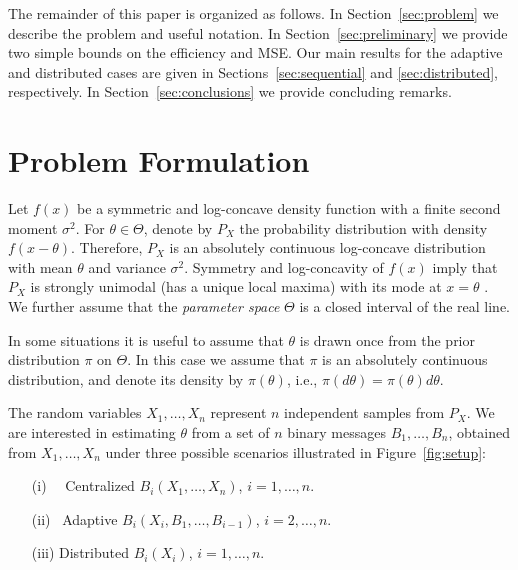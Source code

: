 \documentclass[letterpaper, 11pt]{IEEEtran}      %
\begin{document}
The remainder of this paper is organized as follows. In Section~\ref{sec:problem} we describe the problem and useful notation. In Section~\ref{sec:preliminary} we provide two simple bounds on the efficiency and MSE. Our main results for the adaptive and distributed cases are given in Sections~\ref{sec:sequential} and \ref{sec:distributed}, respectively. In Section~\ref{sec:conclusions} we provide concluding remarks. 

\section{Problem Formulation \label{sec:problem}}

Let $f(x)$ be a symmetric and log-concave density function with a finite second moment $\sigma^2$. For $\theta \in \Theta$, denote by $P_X$ the probability distribution with density $f\left( x-\theta \right)$. Therefore, $P_X$ is an absolutely continuous log-concave distribution with mean $\theta$ and variance $\sigma^2$. Symmetry and log-concavity of $f(x)$ imply that $P_X$ is strongly unimodal (has a unique local maxima) with its mode at $x =\theta$ \cite{ibragimov1956composition}. We further assume that the \emph{parameter space} $\Theta$ is a closed interval of the real line. 
\par
In some situations it is useful to assume that $\theta$ is drawn once from the prior distribution $\pi$ on $\Theta$. In this case we assume that $\pi$ is an absolutely continuous distribution, and denote its density by $\pi(\theta)$, i.e., $\pi(d\theta) = \pi(\theta)d\theta$.  
\par
The random variables $X_1,\ldots,X_n$ represent $n$ independent samples from $P_X$. 
We are interested in estimating $\theta$ from a set of $n$ binary messages $B_1,\ldots,B_n$, obtained from $X_1,\ldots,X_n$ under three possible scenarios illustrated in Figure~\ref{fig:setup}: 
\begin{itemize}
\item[(i)~~] Centralized $B_i(X_1,\ldots,X_n)$, $i=1,\ldots,n$.
\item[(ii)~] Adaptive $B_i(X_i,B_1,\ldots,B_{i-1})$, $i=2,\ldots,n$.
\item[(iii)] Distributed $B_i(X_i)$, $i=1,\ldots,n$.
\end{itemize}
\end{document}
